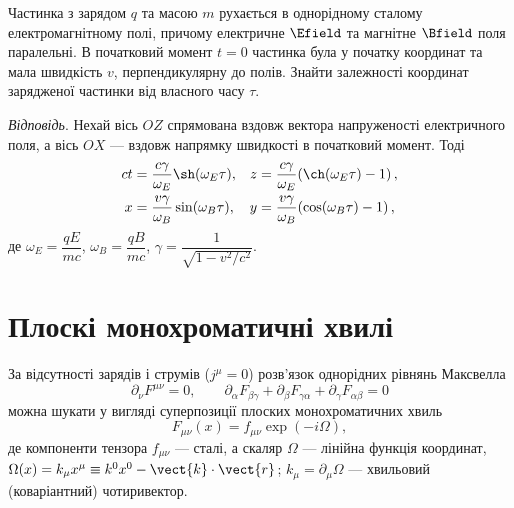 \begin{problem}
    Частинка з зарядом $q$ та масою $m$ рухається в однорідному сталому електромагнітному полі, причому електричне $\Efield$
    та магнітне $\Bfield$ поля паралельні. В початковий момент $t=0$ частинка була у початку координат та мала швидкість
    $v$, перпендикулярну до полів. Знайти залежності координат зарядженої частинки від власного часу $\tau$.

    \textit{Відповідь}. Нехай вісь $OZ$ спрямована вздовж вектора напруженості електричного поля, а вісь $OX$ --- вздовж
    напрямку швидкості в початковий момент. Тоді
    \begin{align*}
        ct & = \frac{c\gamma}{\omega_E}\sh(\omega_E\tau),
           & z                                             & = \frac{c\gamma}{\omega_E}\!\left(\ch(\omega_E\tau)-1\right),  \\
        x  & = \frac{v\gamma}{\omega_B}\sin(\omega_B\tau),
           & y                                             & = \frac{v\gamma}{\omega_B}\!\left(\cos(\omega_B\tau)-1\right),
    \end{align*}
    де $\omega_E = \dfrac{qE}{mc}$, $\omega_B = \dfrac{qB}{mc}$, $\gamma = \dfrac{1}{\sqrt{1-v^2/c^2}}$.
\end{problem}

\section{Плоскі монохроматичні хвилі}

За відсутності зарядів і струмів ($j^{\mu}=0$) розв'язок однорідних рівнянь Максвелла
\begin{equation*}
    \partial_{\nu}F^{\mu\nu} = 0, \qquad
    \partial_{\alpha}F_{\beta\gamma}
    + \partial_{\beta}F_{\gamma\alpha}
    + \partial_{\gamma}F_{\alpha\beta} = 0
\end{equation*}
можна шукати у вигляді суперпозиції плоских монохроматичних хвиль
\begin{equation*}
    F_{\mu\nu}(x) = f_{\mu\nu}\exp(-i\Omega),
\end{equation*}
де компоненти тензора $f_{\mu\nu}$ --- сталі, а скаляр $\Omega$ --- лінійна функція координат,
$\Omega(x)=k_{\mu}x^{\mu}\equiv k^0x^0 - \vect{k}\cdot\vect{r}$; $k_{\mu}=\partial_{\mu}\Omega$ --- хвильовий
(коваріантний) чотиривектор.

